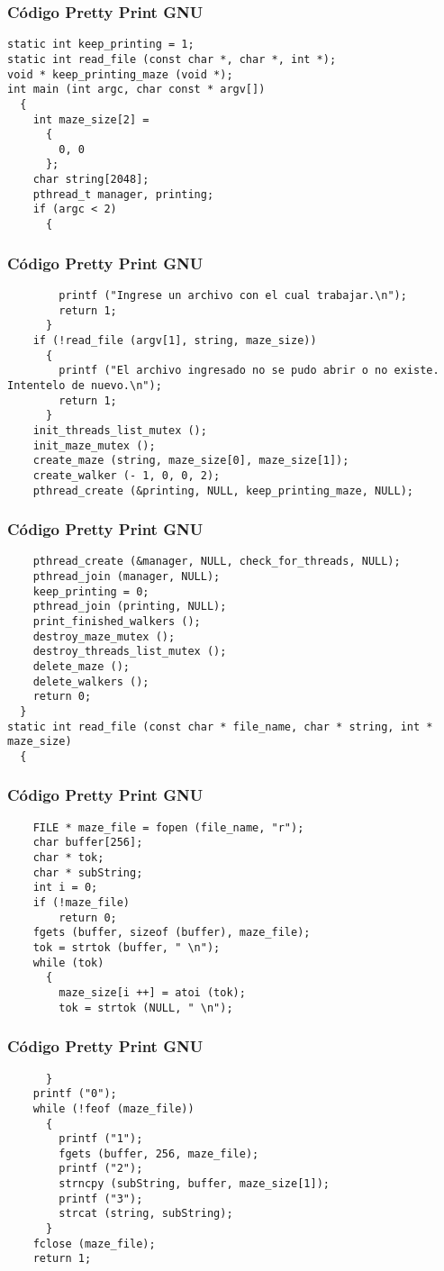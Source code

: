 \documentclass{beamer}
\begin{document}
\begin{frame}[fragile]
\frametitle{C\'odigo Pretty Print GNU}
\begin{verbatim}
static int keep_printing = 1;
static int read_file (const char *, char *, int *);
void * keep_printing_maze (void *);
int main (int argc, char const * argv[])
  {
    int maze_size[2] =
      {
        0, 0
      };
    char string[2048];
    pthread_t manager, printing;
    if (argc < 2)
      {
        \end{verbatim}
\end{frame}
\begin{frame}[fragile]
\frametitle{C\'odigo Pretty Print GNU}
\begin{verbatim}
        printf ("Ingrese un archivo con el cual trabajar.\n");
        return 1;
      }
    if (!read_file (argv[1], string, maze_size))
      {
        printf ("El archivo ingresado no se pudo abrir o no existe. Intentelo de nuevo.\n");
        return 1;
      }
    init_threads_list_mutex ();
    init_maze_mutex ();
    create_maze (string, maze_size[0], maze_size[1]);
    create_walker (- 1, 0, 0, 2);
    pthread_create (&printing, NULL, keep_printing_maze, NULL);
\end{verbatim}
\end{frame}
\begin{frame}[fragile]
\frametitle{C\'odigo Pretty Print GNU}
\begin{verbatim}
    pthread_create (&manager, NULL, check_for_threads, NULL);
    pthread_join (manager, NULL);
    keep_printing = 0;
    pthread_join (printing, NULL);
    print_finished_walkers ();
    destroy_maze_mutex ();
    destroy_threads_list_mutex ();
    delete_maze ();
    delete_walkers ();
    return 0;
  }
static int read_file (const char * file_name, char * string, int * maze_size)
  {
    \end{verbatim}
\end{frame}
\begin{frame}[fragile]
\frametitle{C\'odigo Pretty Print GNU}
\begin{verbatim}
    FILE * maze_file = fopen (file_name, "r");
    char buffer[256];
    char * tok;
    char * subString;
    int i = 0;
    if (!maze_file)
        return 0;
    fgets (buffer, sizeof (buffer), maze_file);
    tok = strtok (buffer, " \n");
    while (tok)
      {
        maze_size[i ++] = atoi (tok);
        tok = strtok (NULL, " \n");
\end{verbatim}
\end{frame}
\begin{frame}[fragile]
\frametitle{C\'odigo Pretty Print GNU}
\begin{verbatim}
      }
    printf ("0");
    while (!feof (maze_file))
      {
        printf ("1");
        fgets (buffer, 256, maze_file);
        printf ("2");
        strncpy (subString, buffer, maze_size[1]);
        printf ("3");
        strcat (string, subString);
      }
    fclose (maze_file);
    return 1;
\end{verbatim}
\end{frame}
\end{document}
